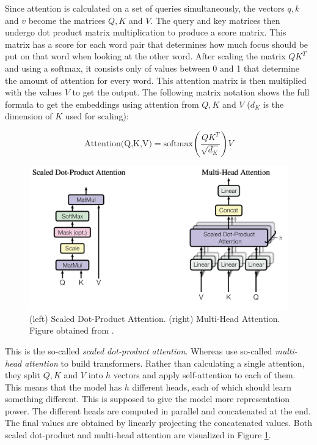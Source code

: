 Since attention is calculated on a set of queries simultaneously, the vectors $q, k$ and $v$ become the matrices $Q, K$ and $V$. The query and key matrices then undergo dot product matrix multiplication to produce a score matrix. This matrix has a score for each word pair that determines how much focus should be put on that word when looking at the other word. After scaling the matrix $Q K^T$ and using a softmax, it consists only of values between 0 and 1 that determine the amount of attention for every word. This attention matrix is then multiplied with the values $V$ to get the output. The following matrix notation shows the full formula to get the embeddings using attention from $Q, K$ and $V$ ($d_K$ is the dimension of $K$ used for scaling):

\begin{equation}
\text{Attention(Q,K,V)} = \text{softmax}\left(\frac{Q K^T}{\sqrt{d_K}} \right)V
\end{equation}

\begin{figure}[h!]
\centering
\includegraphics[width = 1\linewidth]{figures/Attention.png}
\caption{(left) Scaled Dot-Product Attention. (right) Multi-Head Attention. Figure obtained from \citet{vaswani2017attention}.}
\label{fig:attention}
\end{figure}

This is the so-called \textit{scaled dot-product attention}. Whereas \citet{vaswani2017attention} use so-called \textit{multi-head attention} to build transformers. Rather than calculating a single attention, they split $Q, K$ and $V$ into $h$ vectors and apply self-attention to each of them. This means that the model has $h$ different heads, each of which should learn something different. This is supposed to give the model more representation power. The different heads are computed in parallel and concatenated at the end. The final values are obtained by linearly projecting the concatenated values. Both scaled dot-product and multi-head attention are visualized in Figure \ref{fig:attention}.

